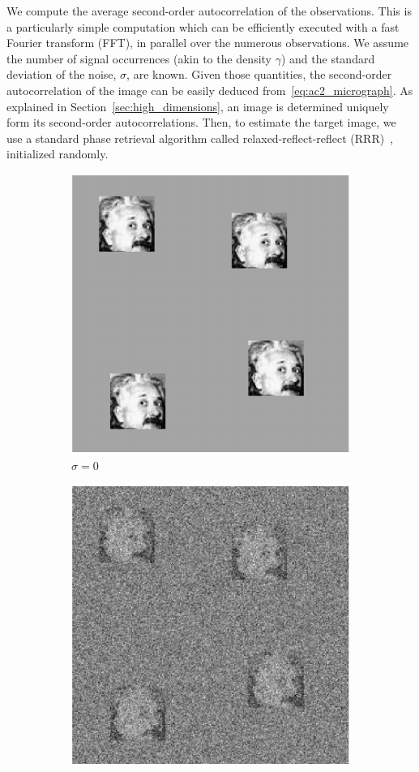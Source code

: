 \documentclass[12pt]{article}
\newcommand{\1}{\mathbf{1}}
\theoremstyle{plain}
\theoremstyle{definition}
\theoremstyle{remark}
\theoremstyle{plain}
\theoremstyle{remark}
\theoremstyle{plain}
\theoremstyle{plain}
\theoremstyle{plain}
\numberwithin{equation}{section}
\begin{document}
We compute the average second-order autocorrelation of the observations. This is a particularly simple computation which can be efficiently executed with a fast Fourier transform (FFT), in parallel over the numerous observations. We assume the number of signal occurrences (akin to the density $\gamma$) and the standard deviation of the noise, $\sigma$, are known. Given those quantities, the second-order autocorrelation of the image can be easily deduced from~\eqref{eq:ac2_micrograph}. As explained in Section~\ref{sec:high_dimensions}, an image is determined uniquely form its second-order autocorrelations. Then, to estimate the target image, we use a standard phase retrieval algorithm called relaxed-reflect-reflect (RRR)~\cite{elser2017rrr}, initialized randomly.


\begin{figure}[t]
	\centering
	\begin{subfigure}[h]{0.33\linewidth}
		\centering
		\includegraphics[width=.8\linewidth]{micrograph_Einstein_example_clean}
		\caption{$\sigma = 0$}
	\end{subfigure}%
	\begin{subfigure}[h]{0.33\linewidth}
		\centering
		\includegraphics[width=.8\linewidth]{micrograph_Einstein_example_s05}

\end{subfigure}
\end{figure}
\end{document}
